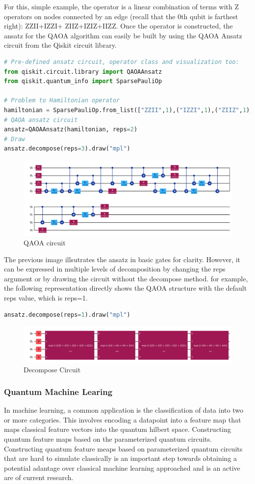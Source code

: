 \documentclass[12pt, oneside]{book}
\theoremstyle{definition}
\theoremstyle{definition}
\theoremstyle{remark}
\begin{document}
For this, simple example, the operator is a linear combination of terms with Z operators on nodes connected by an edge (recall that the 0th qubit is farthest right): ZZII+IZZI+ ZIIZ+IZIZ+IIZZ. Once the operator is constructed, the ansatz for the QAOA algorithm can easily be built by using the QAOA Ansatz circuit from the Qiskit circuit library.
\begin{lstlisting}[language=Python]
# Pre-defined ansatz circuit, operator class and visualization too:
from qiskit.circuit.library import QAOAAnsatz
from qiskit.quantum_info import SparsePauliOp

# Problem to Hamiltonian operator
hamiltonian = SparsePauliOp.from_list(["ZZII",1),("IZZI",1),("ZIIZ",1),("IZIZ",1),("IIZZ",1)]
# QAOA ansatz circuit
ansatz=QAOAAnsatz(hamiltonian, reps=2)
# Draw
ansatz.decompose(reps=3).draw("mpl")
\end{lstlisting}
\begin{figure}[H]
    \centering
    \includegraphics[width=0.5\linewidth]{../images/QAOA_circ.png}
    \caption{QAOA circuit}
    \label{fig:qaoa_circ}
\end{figure}
The previous image illsutrates the ansatz in basic gates for clarity. However, it can be expressed in multiple levels of decomposition by changing the reps argument or by drawing the circuit without the decompose method. for example, the following representation directly shows the QAOA structure with the default reps value, which is reps=1.
\begin{lstlisting}[language=Python]
ansatz.decompose(reps=1).draw("mpl")
\end{lstlisting}
\begin{figure}[H]
    \centering
    \includegraphics[width=0.5\linewidth]{../images/ansatz_reps1.png}
    \caption{Decompose Circuit}
    \label{fig:asnatz_reps1}
\end{figure}

\subsubsection{Quantum Machine Learing}
In machine learning,  a common application is the classification of data into two or more categories. This involves encoding a datapoint into a feature map that maps classical feature vectors into the quantum hilbert space. Constructing quantum feature maps based on the parameterized quantum circuits. Constructing quantum feature meaps based on parameterized quantum circuits that are hard to simulate classically is an important step towards obtaining a potential adantage over classical machine learning approached and is an active are of current research.
\end{document}
